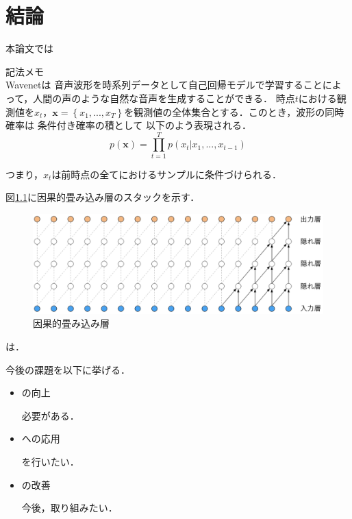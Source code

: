 \chapter{結論}
本論文では

記法メモ\\
Wavenet\cite{oord2016wavenet}は
音声波形を時系列データとして自己回帰モデルで学習することによって，人間の声のような自然な音声を生成することができる．
時点$t$における観測値を$x_t$，$\bm{x} = \left\{ x_1, ..., x_T \right\}$を観測値の全体集合とする．このとき，波形の同時確率は 条件付き確率の積として
以下のよう表現される．
\begin{equation}
	p(\bm{x}) = \prod_{t=1}^T p(x_t | x_1, ..., x_{t-1})
\end{equation}

つまり，$x_t$は前時点の全てにおけるサンプルに条件づけられる．

図\ref{fig:ccl}に因果的畳み込み層のスタックを示す．

\begin{figure}[t]
	\centering
	\includegraphics[width=\linewidth]{./figure/ccl.png}
	\caption{因果的畳み込み層}
	\label{fig:ccl}
\end{figure}

\cite{juang1991hidden}は．

今後の課題を以下に挙げる．
\begin{itemize}
	\item の向上
	\par
	必要がある．
	\item への応用
	\par
	を行いたい．
	\newpage
	\item の改善
	\par
	今後，取り組みたい．
\end{itemize}
